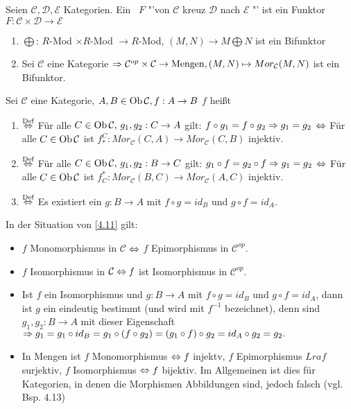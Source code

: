 \begin{df}\label{4.9}
	Seien $\mathcal{C},\mathcal{D}, \mathcal{E}$ Kategorien. Ein  \ $F$ "'von $\mathcal{C}$ kreuz $\mathcal{D} $ nach $\mathcal{E}$ "' ist ein Funktor $F: \mathcal{C} \times \mathcal{D} \to \mathcal{E}$
\end{df}
\begin{bsp}
	\begin{enumerate}  [label= \alph*)]
		\item $\bigoplus$: $R$-Mod $\times R$-Mod $\to R$-Mod, $(M,N) \to M \bigoplus N $ ist ein Bifunktor
		\item Sei $\mathcal{C} $ eine Kategorie $\Rightarrow \mathcal{C}^{op} \times \mathcal{C} \to \text{Mengen}, (M,N) \mapsto  Mor_{\mathcal{C}}(M,N) $ ist ein Bifunktor.
	\end{enumerate}
\end{bsp}
\begin{df}\label{4.11}
	Sei $\mathcal{C}$ eine Kategorie, $ A,B \in \text{Ob}\,\mathcal{C}, f: A \to B $ $f$ heißt
	\begin{enumerate}
		\item[]  $\overset{\text{Def}}{\Leftrightarrow}$ Für alle $C \in \text{Ob}\,\mathcal{C},\, g_1,g_2: C \to A $ gilt: $f \circ g_1 = f \circ g_2 \Rightarrow g_1 = g_2$ $\Leftrightarrow$ Für alle $C \in \text{Ob}\,\mathcal{C}$ ist $f_{\ast}^{C}: Mor_{\mathcal{C}}(C,A) \to Mor_{\mathcal{C}}(C,B)$ injektiv.
		\item[]  $\overset{\text{Def}}{\Leftrightarrow}$ Für alle $C \in \text{Ob}\,\mathcal{C}, \,g_1,g_2: B \to C $ gilt: $g_1 \circ f = g_2 \circ f \Rightarrow g_1 = g_2$ $\Leftrightarrow$ Für alle $C \in \text{Ob}\,\mathcal{C}$ ist $f_{C}^{\ast}: Mor_{\mathcal{C}}(B,C) \to Mor_{\mathcal{C}}(A,C)$ injektiv.
		\item[]  $\overset{\text{Def}}{\Leftrightarrow}$ Es existiert ein $g:B \to A $ mit $ f\circ g = id_B $ und $ g \circ f = id_A.$
	\end{enumerate}
\end{df}
\begin{anm}
	In der Situation von \ref{4.11} gilt:
	\begin{itemize}
		\item $f$ Monomorphismus in $\mathcal{C}$ $\Leftrightarrow$ $f$ Epimorphismus in $\mathcal{C}^{op}.$
		\item $f$ Isomorphismus in $\mathcal{C} \Leftrightarrow  f $ ist Isomorphismus in $\mathcal{C}^{op}.$
		\item Ist $f$ ein Isomorphismus und $g:B \to A $ mit $ f \circ g = id_B $ und $g \circ f = id_A$, dann ist $g$ ein eindeutig bestimmt (und wird mit $f^{-1} $ bezeichnet), denn sind $g_1,g_2: B \to A$ mit dieser Eigenschaft $\Rightarrow g_1 = g_1 \circ id_B = g_1 \circ (f \circ g_2) =(g_1 \circ f) \circ g_2 = id_A \circ g_2 = g_2.$
		\item In Mengen ist $f$ Monomorphismus $\Leftrightarrow f $ injektv, $f$ Epimorphismus $Lra f$ surjektiv, $f$ Isomorphismus $\Leftrightarrow f $ bijektiv. Im Allgemeinen ist dies für Kategorien, in denen die Morphismen Abbildungen sind, jedoch falsch (vgl. Bsp. 4.13)
	\end{itemize}
\end{anm}
